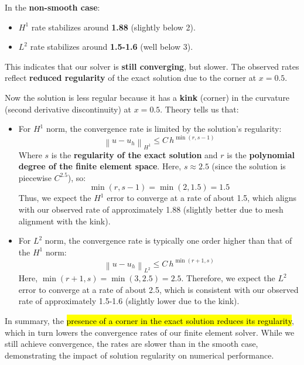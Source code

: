\highspace
In the \textbf{non-smooth case}:
\begin{itemize}
    \item $H^{1}$ rate stabilizes around \textbf{1.88} (slightly below 2).
    \item $L^{2}$ rate stabilizes around \textbf{1.5-1.6} (well below 3).
\end{itemize}
This indicates that our solver is \textbf{still converging}, but slower. The observed rates reflect \textbf{reduced regularity} of the exact solution due to the corner at $x=0.5$.

\newpage

\begin{flushleft}
\end{flushleft}
Now the solution is less regular because it has a \textbf{kink} (corner) in the curvature (second derivative discontinuity) at $x=0.5$. Theory tells us that:
\begin{itemize}
    \item For $H^1$ norm, the convergence rate is limited by the solution's regularity:
    \begin{equation}
        \left\| u - u_h \right\|_{H^1} \le C \, h^{\min\left(r, s-1\right)}
    \end{equation}
    Where $s$ is the \textbf{regularity of the exact solution} and $r$ is the \textbf{polynomial degree of the finite element space}. Here, $s \approx 2.5$ (since the solution is piecewise $C^{2.5}$), so:
    \begin{equation*}
        \min\left(r, s-1\right) = \min\left(2, 1.5\right) = 1.5
    \end{equation*}
    Thus, we expect the $H^1$ error to converge at a rate of about 1.5, which aligns with our observed rate of approximately 1.88 (slightly better due to mesh alignment with the kink).

    \item For $L^2$ norm, the convergence rate is typically one order higher than that of the $H^1$ norm:
    \begin{equation}
        \left\| u - u_h \right\|_{L^2} \le C \, h^{\min\left(r+1, s\right)}
    \end{equation}
    Here, $\min\left(r+1, s\right) = \min\left(3, 2.5\right) = 2.5$. Therefore, we expect the $L^2$ error to converge at a rate of about 2.5, which is consistent with our observed rate of approximately 1.5-1.6 (slightly lower due to the kink).
\end{itemize}
In summary, the \hl{presence of a corner in the exact solution reduces its regularity}, which in turn lowers the convergence rates of our finite element solver. While we still achieve convergence, the rates are slower than in the smooth case, demonstrating the impact of solution regularity on numerical performance.

